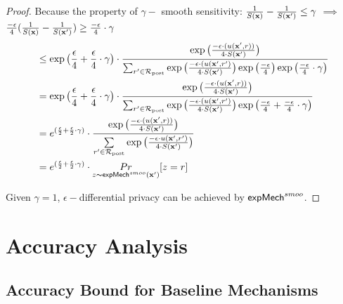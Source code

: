 \documentclass{article}
\begin{document}
\begin{proof}
  Because the property of $\gamma -$ smooth sensitivity: $\frac{1}{S(\textbf{x})} - \frac{1}{S(\textbf{x}')} \leq \gamma$ $\implies$
  $\frac{- \epsilon}{4}
  (\frac{1}{S(\textbf{x})}-
  \frac{1}{S(\textbf{x}')}) \geq \frac{- \epsilon}{4} \cdot \gamma$
  \begin{equation*}
  \begin{split}
  & \leq \exp\big( \frac{\epsilon}{4} + \frac{\epsilon}{4} \cdot \gamma\big) \cdot 
  \frac {
  \exp
  \big(
  \frac{-\epsilon\cdot(u(\textbf{x}', {r}))}{4\cdot S(\textbf{x}')}
  \big)
  } 
  {
  \sum_{r'\in \mathcal{R}_{\textup{post}}} 
  \exp 
  \big(
  \frac{-\epsilon\cdot(u(\textbf{x}', {r'})}{4 \cdot S(\textbf{x}')}
  \big)
  \exp 
  \big(
  \frac{-\epsilon}{4}
  \big)
  \exp
  \big(
  \frac{- \epsilon}{4} \cdot \gamma
  \big)
  }\\
  & = \exp\big( \frac{\epsilon}{4} + \frac{\epsilon}{4} \cdot \gamma\big) \cdot 
  \frac {
  \exp
  \big(
  \frac{-\epsilon\cdot(u(\textbf{x}', {r}))}{4\cdot S(\textbf{x}')}
  \big)
  } 
  {
  \sum_{r'\in \mathcal{R}_{\textup{post}}} 
  \exp 
  \big(
  \frac{-\epsilon\cdot(u(\textbf{x}', {r'})}{4 \cdot S(\textbf{x}')}
  \big)
  \exp 
  \big(
  \frac{-\epsilon}{4} +   \frac{- \epsilon}{4} \cdot \gamma
  \big)
  }\\
  & = e^{( \frac{\epsilon}{2} + \frac{\epsilon}{2} \cdot \gamma )} \cdot 
  \frac {
  \exp
  \big(
  \frac{-\epsilon\cdot(u(\textbf{x}', {r}))}{4\cdot S(\textbf{x}')}
  \big)
  } 
  {
  \sum\limits_{r'\in \mathcal{R}_{\textup{post}}} \exp \big(\frac{-\epsilon\cdot u(\textbf{x}', r')}{4 \cdot S(\textbf{x}')}\big)
  }\\
  & = e^{( \frac{\epsilon}{2} + \frac{\epsilon}{2} \cdot \gamma )} \cdot   \underset{z \thicksim \mathsf{expMech}^{smoo}(\textbf{x}')}{Pr}[z = r]
  \end{split}
  \end{equation*}

  Given $\gamma = 1$, $\epsilon - $differential privacy can be achieved by $\mathsf{expMech}^{smoo}$.


\end{proof}



\section{Accuracy Analysis}

\subsection{Accuracy Bound for Baseline Mechanisms}

\end{document}
